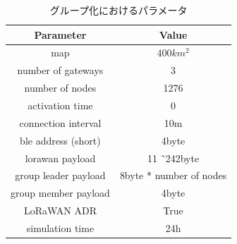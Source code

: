 \documentclass[Japanese]{dicomopapers}
\begin{document}
\begin{table}[h]
    \centering
    \caption{LoRaWANのユースケース}\label{fig:LoRaWAN_Usecase}
\end{table}

\begin{table}[h]
    \centering
    \caption{グループ化におけるパラメータ}\label{fig:group_parameter}
    \begin{tabular}{|c|c|}
    \hline
    \textbf{Parameter}     & \textbf{Value}               \\ \hline
    map                    & $400km^{2}$    　             \\ \hline
    number of gateways     & 3                             \\ \hline
    number of nodes        & 1276                          \\ \hline
    activation time        & 0                             \\ \hline
    connection interval    & 10m                           \\ \hline
    ble address (short)    & 4byte                         \\ \hline
    lorawan payload        & 11 \~\ 242byte                \\ \hline
    group leader payload   & 8byte * number of nodes       \\ \hline
    group member payload   & 4byte                         \\ \hline
    LoRaWAN ADR            & True                          \\ \hline
    simulation time        & 24h                           \\ \hline
    \end{tabular}
\end{table}
\end{document}
